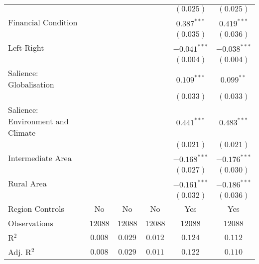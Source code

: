 \begin{center}
\begin{tiny}
\begin{longtable}{l@{} c@{} c@{} c@{} c@{} c@{}}
                                        &                &                  &                & $(0.025)$        & $(0.025)$        \\
\quad Financial Condition               &                &                  &                & $0.387^{***}$    & $0.419^{***}$    \\
                                        &                &                  &                & $(0.035)$        & $(0.036)$        \\
\quad Left-Right                        &                &                  &                & $-0.041^{***}$   & $-0.038^{***}$   \\
                                        &                &                  &                & $(0.004)$        & $(0.004)$        \\
\quad Salience: Globalisation           &                &                  &                & $0.109^{***}$    & $0.099^{**}$     \\
                                        &                &                  &                & $(0.033)$        & $(0.033)$        \\
\quad Salience: Environment and Climate &                &                  &                & $0.441^{***}$    & $0.483^{***}$    \\
                                        &                &                  &                & $(0.021)$        & $(0.021)$        \\
\quad Intermediate Area                 &                &                  &                & $-0.168^{***}$   & $-0.176^{***}$   \\
                                        &                &                  &                & $(0.027)$        & $(0.030)$        \\
\quad Rural Area                        &                &                  &                & $-0.161^{***}$   & $-0.186^{***}$   \\
                                        &                &                  &                & $(0.032)$        & $(0.036)$        \\
\hline
Region Controls                         & No             & No               & No             & Yes              & Yes              \\
Observations                            & 12088          & 12088            & 12088          & 12088            & 12088            \\
R$^2$                                   & $0.008$        & $0.029$          & $0.012$        & $0.124$          & $0.112$          \\
Adj. R$^2$                              & $0.008$        & $0.029$          & $0.011$        & $0.122$          & $0.110$          \\
\end{longtable}
\end{tiny}
\end{center}
